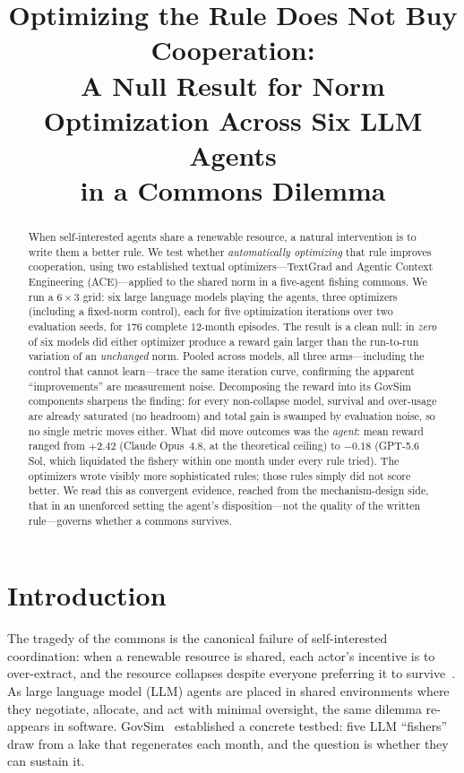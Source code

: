 \documentclass[11pt]{article}
\title{\textbf{Optimizing the Rule Does Not Buy Cooperation:\\
A Null Result for Norm Optimization Across Six LLM Agents\\
in a Commons Dilemma}}
\author{}
\date{}
\begin{document}
\maketitle

\begin{abstract}
When self-interested agents share a renewable resource, a natural intervention is
to write them a better rule. We test whether \emph{automatically optimizing} that
rule improves cooperation, using two established textual optimizers---TextGrad and
Agentic Context Engineering (ACE)---applied to the shared norm in a five-agent
fishing commons. We run a $6\times3$ grid: six large language models playing the
agents, three optimizers (including a fixed-norm control), each for five
optimization iterations over two evaluation seeds, for $176$ complete $12$-month
episodes. The result is a clean null: in \emph{zero} of six models did either
optimizer produce a reward gain larger than the run-to-run variation of an
\emph{unchanged} norm. Pooled across models, all three arms---including the
control that cannot learn---trace the same iteration curve, confirming the
apparent ``improvements'' are measurement noise. Decomposing the reward into its
GovSim components sharpens the finding: for every non-collapse model, survival and
over-usage are already saturated (no headroom) and total gain is swamped by
evaluation noise, so no single metric moves either. What did move outcomes was the
\emph{agent}: mean reward ranged from $+2.42$ (Claude Opus~4.8, at the theoretical
ceiling) to $-0.18$ (GPT-5.6 Sol, which liquidated the fishery within one month
under every rule tried). The optimizers wrote visibly more sophisticated rules;
those rules simply did not score better. We read this as convergent evidence,
reached from the mechanism-design side, that in an unenforced setting the agent's
disposition---not the quality of the written rule---governs whether a commons
survives.
\end{abstract}

\section{Introduction}
The tragedy of the commons is the canonical failure of self-interested
coordination: when a renewable resource is shared, each actor's incentive is to
over-extract, and the resource collapses despite everyone preferring it to
survive~\citep{hardin1968,ostrom1990}. As large language model (LLM) agents are
placed in shared environments where they negotiate, allocate, and act with
minimal oversight, the same dilemma re-appears in software. GovSim~\citep{govsim}
established a concrete testbed: five LLM ``fishers'' draw from a lake that
regenerates each month, and the question is whether they can sustain it.
\end{document}
